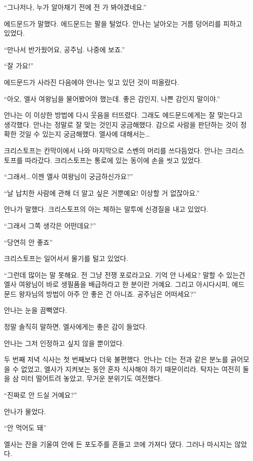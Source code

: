 ``그나저나, 누가 알아채기 전에 전 가 봐야겠네요.''

에드문드가 말했다. 에드문드는 팔을 털었다. 안나는 날아오는 거름 덩어리를 피하고 있었다.

``만나서 반가웠어요, 공주님. 나중에 보죠.''

``잘 가요!''

에드문드가 사라진 다음에야 안나는 잊고 있던 것이 떠올랐다.

``아오, 엘사 여왕님을 물어봤어야 했는데. 좋은 감인지, 나쁜 감인지 말이야.''

안나는 이 이상한 방법에 다시 웃음을 터뜨렸다. 그래도 에드문드에게는 잘 맞는다고 생각했다. 안나는 정말로 잘 맞는 것인지 궁금해했다. 감으로 사람을 판단하는 것이 정확한 것일 수 있는지 궁금해했다. 엘사에 대해서는\ldots

크리스토프는 칸막이에서 나와 마지막으로 스벤의 머리를 쓰다듬었다. 안나는 크리스토프를 따라갔다. 크리스토프는 통로에 있는 동이에 손을 씻고 있었다.

``그래서\ldots\,이젠 엘사 여왕님이 궁금하신가요?''

``날 납치한 사람에 관해 더 알고 싶은 거뿐예요! 이상할 거 없잖아요.''

안나가 말했다. 크리스토프의 아는 체하는 말투에 신경질을 내고 있었다.

``그래서 그쪽 생각은 어떤데요?''

``당연히 안 좋죠''

크리스토프는 일어서서 물기를 털고 있었다.

``그런데 많이는 말 못해요. 전 그냥 전쟁 포로라고요. 기억 안 나세요? 말할 수 있는건 엘사 여왕님이 바로 생필품을 배급하라고 한 분이란 거예요. 그리고 아시다시피, 에드문드 왕자님의 방법이 아주 안 좋은 건 아니죠. 공주님은 어떠세요?''

안나는 눈을 끔뻑였다.

정말 솔직히 말하면, 엘사에게는 좋은 감이 들었다.

안나는 그저 인정하고 싶지 않을 뿐이었다.

\textbreak

두 번째 저녁 식사는 첫 번째보다 더욱 불편했다. 안나는 더는 전과 같은 분노를 긁어모을 수 없었고, 엘사가 지켜보는 동안 혼자 식사해야 하기 때문이리라. 탁자는 여전히 둘을 삼 미터 떨어트려 놓았고, 무거운 분위기도 여전했다.

``진짜로 안 드실 거예요?''

안나가 물었다.

``안 먹어도 돼''

엘사는 잔을 기울여 안에 든 포도주를 흔들고 코에 가져다 댔다. 그러나 마시지는 않았다.

